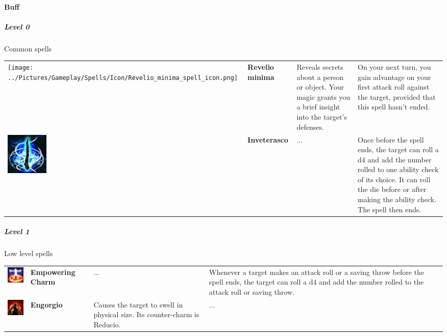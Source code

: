 \paragraph{Buff} 

\subparagraph{Level 0} 
Common spells \\
\begin{tabular}{ m{2cm}m{3cm}m{4cm}m{6cm} } 
	\texttt{[image: ../Pictures/Gameplay/Spells/Icon/Revelio\_minima\_spell\_icon.png]} & \textbf{Revelio minima} & Reveals secrets about a person or object. Your magic grants you a brief insight into the target's defenses. & On your next turn, you gain advantage on your first attack roll against the target, provided that this spell hasn't ended. \\ 
   \includegraphics[width=2cm]{../Pictures/Gameplay/Spells/Icon/Inveterasco_spell_icon.png} & \textbf{Inveterasco} & ... & Once before the spell ends, the target can roll a d4 and add the number rolled to one ability check of its choice. It can roll the die before or after making the ability check. The spell then ends. \\ %
\end{tabular}

\subparagraph{Level 1} 
Low level spells \\
\begin{tabular}{ m{2cm}m{3cm}m{4cm}m{6cm} } 
	\includegraphics[width=2cm]{../Pictures/Gameplay/Spells/Icon/Empowering_spell_icon.png} & \textbf{Empowering Charm} & ... & Whenever a target makes an attack roll or a saving throw before the spell ends, the target can roll a d4 and add the number rolled to the attack roll or saving throw. \\ %
\includegraphics[width=2cm]{../Pictures/Gameplay/Spells/Icon/spell_icon.png} & \textbf{Engorgio} & Causes the target to swell in physical size. Its counter-charm is Reducio. & ... \\ 
\end{tabular}

